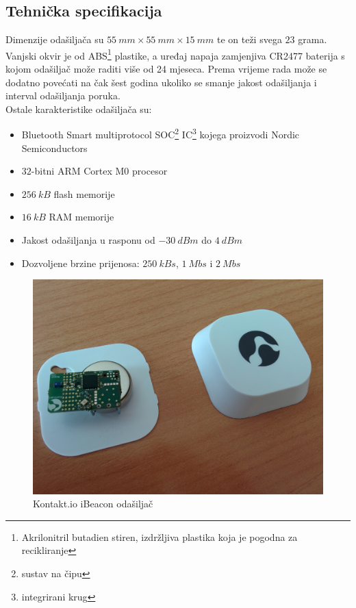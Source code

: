 \subsection*{Tehnička specifikacija}

Dimenzije odašiljača su $\SI{55}{mm} \times \SI{55}{mm} \times \SI{15}{mm}$ te on teži svega $23$ grama. 
Vanjski okvir je od ABS\footnote{Akrilonitril butadien stiren, izdržljiva plastika koja je pogodna za recikliranje} plastike, a uređaj napaja zamjenjiva CR2477 baterija s kojom odašiljač može raditi više od 24 mjeseca. 
Prema \citep{kontaktTehnical} vrijeme rada može se dodatno povećati na čak šest godina ukoliko se smanje jakost odašiljanja i interval odašiljanja poruka.
\\
Ostale karakteristike odašiljača su:
\begin{itemize}
    \item Bluetooth Smart multiprotocol SOC\footnote{sustav na čipu } IC\footnote{integrirani krug } kojega proizvodi Nordic Semiconductors
    \item $32$-bitni ARM Cortex M0 procesor
    \item $\SI{256}{kB}$ flash memorije
    \item $\SI{16}{kB}$ RAM memorije
    \item Jakost odašiljanja u rasponu od $\SI{-30}{dBm}$ do $\SI{+4}{dBm}$
    \item Dozvoljene brzine prijenosa: $\SI{250}{kBs}$, $\SI{1}{Mbs}$ i $\SI{2}{Mbs}$
\end{itemize}

\begin{figure}[H]
    \centering
    \includegraphics[scale=0.1]{pictures/IMG_20140505_095855}
    \caption{Kontakt.io iBeacon odašiljač}
\end{figure}

